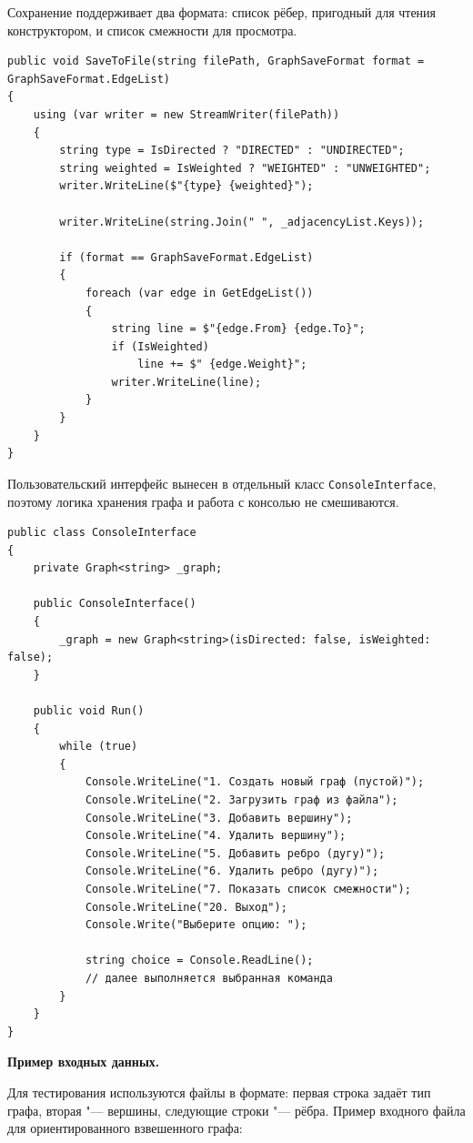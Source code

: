 \documentclass[pract]{SCWorks}
\newcommand{\smalltt}[1]{{\footnotesize\texttt{#1}}}
\begin{document}
    Сохранение поддерживает два формата: список рёбер, пригодный для чтения конструктором, и список смежности для просмотра.

    \begin{verbatim}
public void SaveToFile(string filePath, GraphSaveFormat format = GraphSaveFormat.EdgeList)
{
    using (var writer = new StreamWriter(filePath))
    {
        string type = IsDirected ? "DIRECTED" : "UNDIRECTED";
        string weighted = IsWeighted ? "WEIGHTED" : "UNWEIGHTED";
        writer.WriteLine($"{type} {weighted}");

        writer.WriteLine(string.Join(" ", _adjacencyList.Keys));

        if (format == GraphSaveFormat.EdgeList)
        {
            foreach (var edge in GetEdgeList())
            {
                string line = $"{edge.From} {edge.To}";
                if (IsWeighted)
                    line += $" {edge.Weight}";
                writer.WriteLine(line);
            }
        }
    }
}
    \end{verbatim}

    Пользовательский интерфейс вынесен в отдельный класс \smalltt{ConsoleInterface}, поэтому логика хранения графа и работа с консолью не смешиваются.

    \begin{verbatim}
public class ConsoleInterface
{
    private Graph<string> _graph;

    public ConsoleInterface()
    {
        _graph = new Graph<string>(isDirected: false, isWeighted: false);
    }

    public void Run()
    {
        while (true)
        {
            Console.WriteLine("1. Создать новый граф (пустой)");
            Console.WriteLine("2. Загрузить граф из файла");
            Console.WriteLine("3. Добавить вершину");
            Console.WriteLine("4. Удалить вершину");
            Console.WriteLine("5. Добавить ребро (дугу)");
            Console.WriteLine("6. Удалить ребро (дугу)");
            Console.WriteLine("7. Показать список смежности");
            Console.WriteLine("20. Выход");
            Console.Write("Выберите опцию: ");

            string choice = Console.ReadLine();
            // далее выполняется выбранная команда
        }
    }
}
    \end{verbatim}

    \textbf{Пример входных данных.}

    Для тестирования используются файлы в формате: первая строка задаёт тип графа, вторая "--- вершины, следующие строки "--- рёбра.
    Пример входного файла для ориентированного взвешенного графа:
\end{document}
